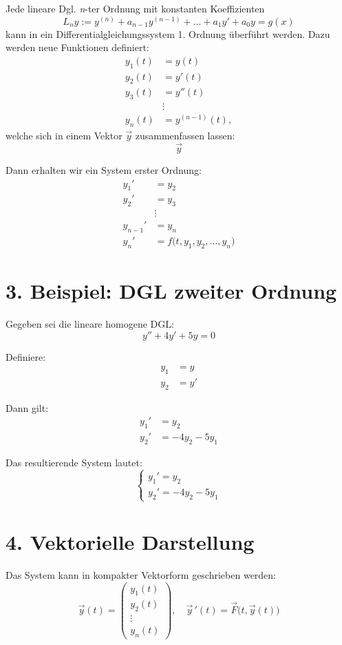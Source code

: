 Jede lineare Dgl. \emph{n}-ter Ordnung mit konstanten Koeffizienten
\[ 
L_n y := y^{(n)} + a_{n-1} y^{(n-1)} + ... + a_1 y'+ a_0 y = g(x)
\]
kann in ein Differentialgleichungssystem 1. Ordnung \"uberf\"uhrt werden.
Dazu werden neue Funktionen definiert:
\begin{align*}
  y_1(t) &= y(t) \\
  y_2(t) &= y'(t) \\
  y_3(t) &= y''(t) \\
        &\vdots \\
  y_n(t) &= y^{(n-1)}(t),
\end{align*}
welche sich in einem Vektor $\vec y$ zusammenfassen lassen:
$$
\vec y
$$

Dann erhalten wir ein System erster Ordnung:
\begin{align*}
  y_1' &= y_2 \\
  y_2' &= y_3 \\
       &\vdots \\
  y_{n-1}' &= y_n \\
  y_n' &= f\big(t, y_1, y_2, \dots, y_n\big)
\end{align*}

\section*{3. Beispiel: DGL zweiter Ordnung}

Gegeben sei die lineare homogene DGL:
\[ y'' + 4y' + 5y = 0 \]

Definiere:
\begin{align*}
  y_1 &= y \\
  y_2 &= y'
\end{align*}

Dann gilt:
\begin{align*}
  y_1' &= y_2 \\
  y_2' &= -4y_2 - 5y_1
\end{align*}

Das resultierende System lautet:
\[ \begin{cases}
  y_1' = y_2 \\
  y_2' = -4y_2 - 5y_1
\end{cases} \]

\section*{4. Vektorielle Darstellung}

Das System kann in kompakter Vektorform geschrieben werden:
\[ \vec{y}(t) = \begin{pmatrix} y_1(t) \\ y_2(t) \\ \vdots \\ y_n(t) \end{pmatrix}, \quad \vec{y}\,'(t) = \vec{F}\big(t, \vec{y}(t)\big) \]


